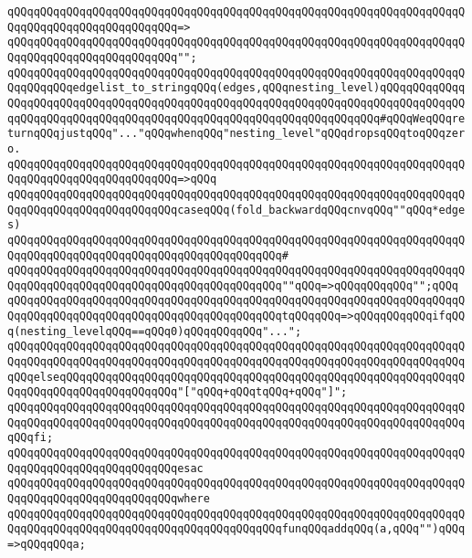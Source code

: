 \verb|qQQqqQQqqQQqqQQqqQQqqQQqqQQqqQQqqQQqqQQqqQQqqQQqqQQqqQQqqQQqqQQqqQQqqQQqqQQqqQQqqQQqqQQqqQQqqQQq=>|\newline
\verb|qQQqqQQqqQQqqQQqqQQqqQQqqQQqqQQqqQQqqQQqqQQqqQQqqQQqqQQqqQQqqQQqqQQqqQQqqQQqqQQqqQQqqQQqqQQqqQQq"";|\newline
\newline
\verb|qQQqqQQqqQQqqQQqqQQqqQQqqQQqqQQqqQQqqQQqqQQqqQQqqQQqqQQqqQQqqQQqqQQqqQQqqQQqqQQqedgelist_to_stringqQQq(edges,qQQqnesting_level)qQQqqQQqqQQqqQQqqQQqqQQqqQQqqQQqqQQqqQQqqQQqqQQqqQQqqQQqqQQqqQQqqQQqqQQqqQQqqQQqqQQqqQQqqQQqqQQqqQQqqQQqqQQqqQQqqQQqqQQqqQQqqQQqqQQqqQQqqQQq#qQQqWeqQQqreturnqQQqjustqQQq"..."qQQqwhenqQQq"nesting_level"qQQqdropsqQQqtoqQQqzero.|\newline
\verb|qQQqqQQqqQQqqQQqqQQqqQQqqQQqqQQqqQQqqQQqqQQqqQQqqQQqqQQqqQQqqQQqqQQqqQQqqQQqqQQqqQQqqQQqqQQqqQQq=>qQQq|\newline
\verb|qQQqqQQqqQQqqQQqqQQqqQQqqQQqqQQqqQQqqQQqqQQqqQQqqQQqqQQqqQQqqQQqqQQqqQQqqQQqqQQqqQQqqQQqqQQqqQQqcaseqQQq(fold_backwardqQQqcnvqQQq""qQQq*edges)|\newline
\verb|qQQqqQQqqQQqqQQqqQQqqQQqqQQqqQQqqQQqqQQqqQQqqQQqqQQqqQQqqQQqqQQqqQQqqQQqqQQqqQQqqQQqqQQqqQQqqQQqqQQqqQQqqQQqqQQq#|\newline
\verb|qQQqqQQqqQQqqQQqqQQqqQQqqQQqqQQqqQQqqQQqqQQqqQQqqQQqqQQqqQQqqQQqqQQqqQQqqQQqqQQqqQQqqQQqqQQqqQQqqQQqqQQqqQQqqQQq""qQQq=>qQQqqQQqqQQq"";qQQq|\newline
\verb|qQQqqQQqqQQqqQQqqQQqqQQqqQQqqQQqqQQqqQQqqQQqqQQqqQQqqQQqqQQqqQQqqQQqqQQqqQQqqQQqqQQqqQQqqQQqqQQqqQQqqQQqqQQqqQQqtqQQqqQQq=>qQQqqQQqqQQqifqQQq(nesting_levelqQQq==qQQq0)qQQqqQQqqQQq"...";|\newline
\verb|qQQqqQQqqQQqqQQqqQQqqQQqqQQqqQQqqQQqqQQqqQQqqQQqqQQqqQQqqQQqqQQqqQQqqQQqqQQqqQQqqQQqqQQqqQQqqQQqqQQqqQQqqQQqqQQqqQQqqQQqqQQqqQQqqQQqqQQqqQQqqQQqelseqQQqqQQqqQQqqQQqqQQqqQQqqQQqqQQqqQQqqQQqqQQqqQQqqQQqqQQqqQQqqQQqqQQqqQQqqQQqqQQqqQQqqQQq"["qQQq+qQQqtqQQq+qQQq"]";|\newline
\verb|qQQqqQQqqQQqqQQqqQQqqQQqqQQqqQQqqQQqqQQqqQQqqQQqqQQqqQQqqQQqqQQqqQQqqQQqqQQqqQQqqQQqqQQqqQQqqQQqqQQqqQQqqQQqqQQqqQQqqQQqqQQqqQQqqQQqqQQqqQQqqQQqfi;|\newline
\verb|qQQqqQQqqQQqqQQqqQQqqQQqqQQqqQQqqQQqqQQqqQQqqQQqqQQqqQQqqQQqqQQqqQQqqQQqqQQqqQQqqQQqqQQqqQQqqQQqesac|\newline
\verb|qQQqqQQqqQQqqQQqqQQqqQQqqQQqqQQqqQQqqQQqqQQqqQQqqQQqqQQqqQQqqQQqqQQqqQQqqQQqqQQqqQQqqQQqqQQqqQQqwhere|\newline
\verb|qQQqqQQqqQQqqQQqqQQqqQQqqQQqqQQqqQQqqQQqqQQqqQQqqQQqqQQqqQQqqQQqqQQqqQQqqQQqqQQqqQQqqQQqqQQqqQQqqQQqqQQqqQQqqQQqfunqQQqaddqQQq(a,qQQq"")qQQq=>qQQqqQQqa;|\newline
